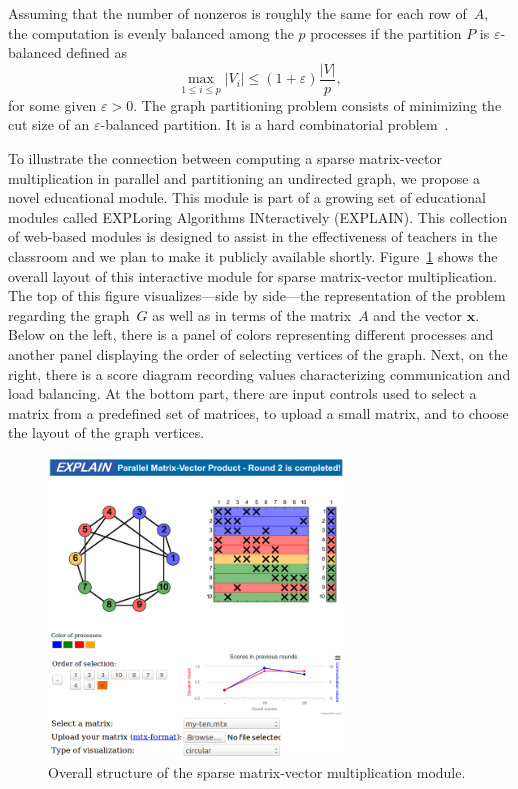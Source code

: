 \documentclass[12pt, twoside,a4paper,toc=bibliography]{scrbook}
\newcommand{\mat}[1]{\ensuremath{#1}}
\newcommand{\vek}[1]{{\ensuremath{\mathbf #1}}}
\begin{document}
Assuming that the number of nonzeros is roughly the same for each row of~\mat{A}, the
computation is evenly balanced among the $p$ processes if the partition $P$ is
$\varepsilon$-balanced defined as
\begin{equation}\label{e.bal}
\max_{1 \leq i \leq p} |V_i| \leq (1 + \varepsilon) \frac{|V|}{p} ,
\end{equation}
for some given $\varepsilon > 0$. The graph partitioning problem consists of minimizing
the cut size of an $\varepsilon$-balanced partition. It is a hard combinatorial
problem~\cite{gj:com}.


To illustrate the connection between computing a sparse matrix-vector multiplication in
parallel and partitioning an undirected graph, we propose a novel educational module.
This module is part of a growing set of educational modules called EXPLoring Algorithms
INteractively (EXPLAIN). This collection of web-based modules is designed to assist in
the effectiveness of teachers in the classroom and we plan to make it publicly available
shortly. Figure~\ref{f.explain.matvec} shows the overall layout of this interactive
module for sparse matrix-vector multiplication. The top of this figure visualizes---side by side---the representation of the problem regarding the graph~$G$ as well as in terms
of the matrix~\mat{A} and the vector \vek{x}. Below on the left, there is a panel of
colors representing different processes and another panel displaying the order of
selecting vertices of the graph. Next, on the right, there is a score diagram recording
values characterizing communication and load balancing. At the bottom part, there are
input controls used to select a matrix from a predefined set of matrices, to upload a
small matrix, and to choose the layout of the graph vertices.


\begin{figure}
\centering
\includegraphics[width=0.7\textwidth]{final}
\caption{Overall structure of the sparse matrix-vector multiplication module.}
\label{f.explain.matvec}
\end{figure}
\end{document}
